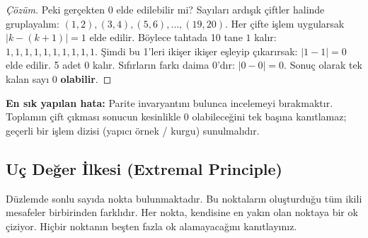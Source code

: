 \begin{proof}[Çözüm]
Peki gerçekten 0 elde edilebilir mi?
Sayıları ardışık çiftler halinde gruplayalım:
$(1,2), (3,4), (5,6), \dots, (19,20)$.
Her çifte işlem uygularsak $|k - (k+1)| = 1$ elde edilir.
Böylece tahtada 10 tane $1$ kalır: $1, 1, 1, 1, 1, 1, 1, 1, 1, 1$.
Şimdi bu 1'leri ikişer ikişer eşleyip çıkarırsak:
$|1 - 1| = 0$ elde edilir. 5 adet $0$ kalır.
Sıfırların farkı daima $0$'dır: $|0 - 0| = 0$.
Sonuç olarak tek kalan sayı $0$ \textbf{olabilir}.
\end{proof}

\textbf{En sık yapılan hata:} Parite invaryantını bulunca incelemeyi bırakmaktır. Toplamın çift çıkması sonucun kesinlikle 0 olabileceğini tek başına kanıtlamaz; geçerli bir işlem dizisi (yapıcı örnek / kurgu) sunulmalıdır.

\subsection{Uç Değer İlkesi (Extremal Principle)}

\begin{example}
Düzlemde sonlu sayıda nokta bulunmaktadır. Bu noktaların oluşturduğu tüm ikili mesafeler birbirinden farklıdır. Her nokta, kendisine en yakın olan noktaya bir ok çiziyor. Hiçbir noktanın beşten fazla ok alamayacağını kanıtlayınız.
\end{example}

